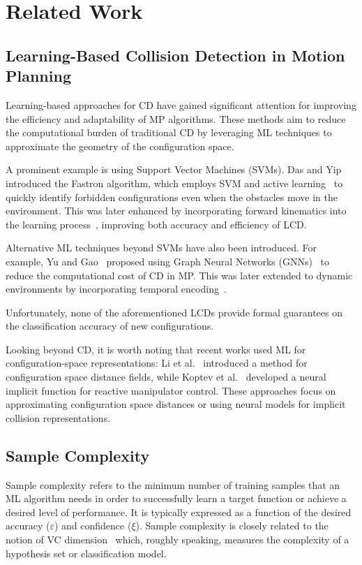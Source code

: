 \section{Related Work}
\label{sec:related-work}

\subsection{Learning-Based Collision Detection in Motion Planning}
Learning-based approaches for CD have gained significant attention for improving the efficiency and adaptability of MP algorithms. These methods aim to reduce the computational burden of traditional CD by leveraging ML techniques to approximate the geometry of the configuration space.

A prominent example is using Support Vector Machines (SVMs). 
%
Das and Yip~\cite{das2020learning} introduced the Fastron algorithm, which employs SVM and active learning~\cite{settles2009active} to quickly identify forbidden configurations even when the obstacles move in the environment. 
This was later enhanced by incorporating forward kinematics into the learning process~\cite{das2020forward}, improving both accuracy and efficiency of LCD.


Alternative ML techniques beyond SVMs have also been introduced. 
For example, Yu and Gao~\cite{yu2021reducing} proposed using Graph Neural Networks (GNNs)~\cite{zhou2020graph} to reduce the computational cost of CD in MP.
This was later extended to dynamic environments by incorporating temporal encoding~\cite{zhang2022learning}.

Unfortunately, none of the aforementioned LCDs provide formal guarantees on the classification accuracy of new configurations.

{Looking beyond CD, it is worth noting that recent works used ML for configuration-space representations: 
Li et al.~\cite{Li2024} introduced a method for configuration space distance fields, 
while Koptev et al.~\cite{Koptev2022} developed a neural implicit function for reactive manipulator control.
These approaches focus on approximating configuration space distances or using neural models for implicit 
collision representations.}

\subsection{Sample Complexity}
Sample complexity refers to the minimum number of training samples that an ML algorithm needs in order to successfully learn a target function or achieve a desired level of performance. It is typically expressed as a function of the desired accuracy ($\varepsilon$) and confidence ($\xi$).
%
Sample complexity is closely related to the notion of VC dimension~\cite{vapnik2015uniform} which, roughly speaking, measures the complexity of a hypothesis set or classification model.

